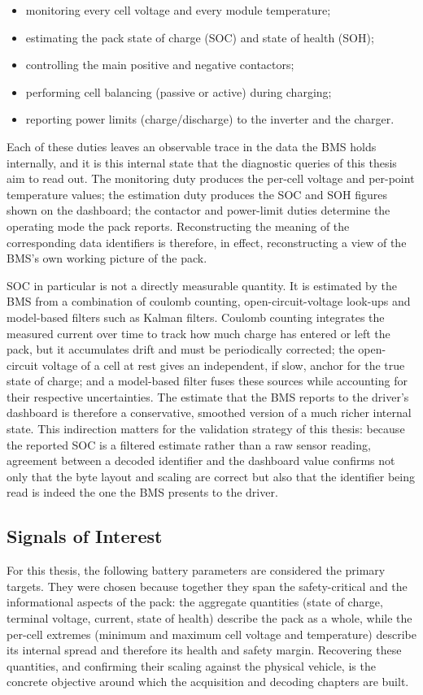 \documentclass[11pt,a4paper,oneside,parskip=half]{scrreprt}
\begin{document}
\begin{itemize}
  \item monitoring every cell voltage and every module temperature;
  \item estimating the pack state of charge (SOC) and state of health (SOH);
  \item controlling the main positive and negative contactors;
  \item performing cell balancing (passive or active) during charging;
  \item reporting power limits (charge/discharge) to the inverter and the charger.
\end{itemize}

Each of these duties leaves an observable trace in the data the BMS holds internally, and it is this internal state that the diagnostic queries of this thesis aim to read out. The monitoring duty produces the per-cell voltage and per-point temperature values; the estimation duty produces the SOC and SOH figures shown on the dashboard; the contactor and power-limit duties determine the operating mode the pack reports. Reconstructing the meaning of the corresponding data identifiers is therefore, in effect, reconstructing a view of the BMS's own working picture of the pack.

SOC in particular is not a directly measurable quantity. It is estimated by the BMS from a combination of coulomb counting, open-circuit-voltage look-ups and model-based filters such as Kalman filters. Coulomb counting integrates the measured current over time to track how much charge has entered or left the pack, but it accumulates drift and must be periodically corrected; the open-circuit voltage of a cell at rest gives an independent, if slow, anchor for the true state of charge; and a model-based filter fuses these sources while accounting for their respective uncertainties. The estimate that the BMS reports to the driver's dashboard is therefore a conservative, smoothed version of a much richer internal state. This indirection matters for the validation strategy of this thesis: because the reported SOC is a filtered estimate rather than a raw sensor reading, agreement between a decoded identifier and the dashboard value confirms not only that the byte layout and scaling are correct but also that the identifier being read is indeed the one the BMS presents to the driver.

\subsection{Signals of Interest}
For this thesis, the following battery parameters are considered the primary targets. They were chosen because together they span the safety-critical and the informational aspects of the pack: the aggregate quantities (state of charge, terminal voltage, current, state of health) describe the pack as a whole, while the per-cell extremes (minimum and maximum cell voltage and temperature) describe its internal spread and therefore its health and safety margin. Recovering these quantities, and confirming their scaling against the physical vehicle, is the concrete objective around which the acquisition and decoding chapters are built.
\end{document}
